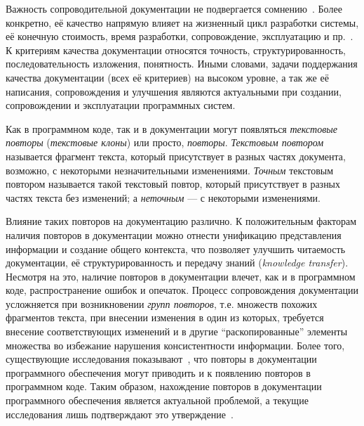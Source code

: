 Важность сопроводительной документации не подвергается сомнению~\cite{kipyegen2013importance,chomal2014significance}.
Более конкретно, её качество напрямую влияет на жизненный цикл разработки системы, её конечную стоимость, время разработки, сопровождение, эксплуатацию и пр.~\cite{plosch2014value}. 
К критериям качества документации относятся точность, структурированность, последовательность изложения, понятность.
Иными словами, задачи поддержания качества документации (всех её критериев) на высоком уровне, а так же её написания, сопровождения и улучшения являются актуальными при создании, сопровождении и эксплуатации программных систем.

Как в программном коде, так и в документации могут появляться \emph{текстовые повторы} (\emph{текстовые клоны}) или просто, \emph{повторы}.
\emph{Текстовым повтором} называется фрагмент текста, который присутствует в разных частях документа, возможно, с некоторыми незначительными изменениями.
\emph{Точным} текстовым повтором называется такой текстовый повтор, который присутствует в разных частях текста без изменений; а \emph{неточным} --- с некоторыми изменениями. 

Влияние таких повторов на документацию различно.
К положительным факторам наличия повторов в документации можно отнести унификацию представления информации и создание общего контекста, что позволяет улучшить читаемость документации, её структурированность и передачу знаний (\emph{knowledge transfer}).
Несмотря на это, наличие повторов в документации влечет, как и в программном коде,  распространение ошибок и опечаток.
Процесс сопровождения документации усложняется при возникновении \emph{групп повторов}, т.е. множеств похожих фрагментов текста, при внесении изменения в один из которых, требуется внесение соответствующих изменений и в другие ``раскопированные'' элементы множества во избежание нарушения консистентности информации.
Более того, существующие исследования показывают~\cite{juergens2010can}, что повторы в документации программного обеспечения могут приводить и к появлению повторов в программном коде.
Таким образом, нахождение повторов в документации программного обеспечения является актуальной проблемой, а текущие исследования лишь подтверждают это утверждение~\cite{horie2010tool, poruban2014reusable, poruban2016preliminary, juergens2010can, oumaziz2017documentation}.

